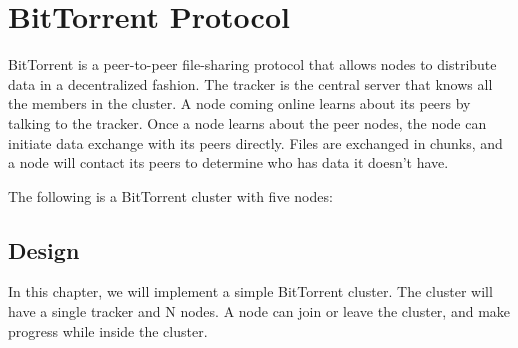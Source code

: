 % 

\usetikzlibrary{arrows.meta} %

\chapter{BitTorrent Protocol}

BitTorrent is a peer-to-peer file-sharing protocol that allows nodes to 
distribute data in a decentralized fashion. The tracker is the central server
that knows all the members in the cluster. A node coming online learns about its
peers by talking to the tracker. Once a node learns about the peer nodes, the
node can initiate data exchange with its peers directly. Files are exchanged in 
chunks, and a node will contact its peers to determine who has data it doesn't
have.

\pagebreak

The following is a BitTorrent cluster with five nodes:

\begin{center}
\end{center}

\section{Design}

In this chapter, we will implement a simple BitTorrent cluster. The cluster will
have a single tracker and N nodes. A node can join or leave the cluster, and
make progress while inside the cluster.\\

